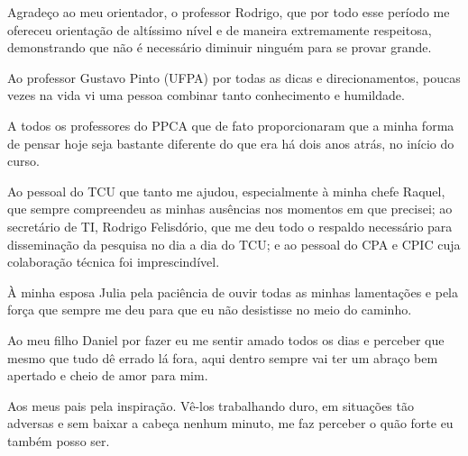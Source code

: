Agradeço ao meu orientador, o professor Rodrigo, que por todo esse período
me ofereceu orientação de altíssimo nível e de maneira extremamente respeitosa,
demonstrando que não é necessário diminuir ninguém para se provar grande.

Ao professor Gustavo Pinto (UFPA) por todas as dicas e direcionamentos, poucas
vezes na vida vi uma pessoa combinar tanto conhecimento e humildade.

A todos os professores do PPCA que de fato proporcionaram que a minha forma de
pensar hoje seja bastante diferente do que era há dois anos atrás, no início do
curso.

Ao pessoal do TCU que tanto me ajudou, especialmente à minha chefe Raquel, que
sempre compreendeu as minhas ausências nos momentos em que precisei; ao
secretário de TI, Rodrigo Felisdório, que me deu todo o respaldo necessário para
disseminação da pesquisa no dia a dia do TCU; e ao pessoal do CPA e CPIC cuja
colaboração técnica foi imprescindível.

À minha esposa Julia pela paciência de ouvir todas as minhas lamentações e pela
força que sempre me deu para que eu não desistisse no meio do caminho.

Ao meu filho Daniel por fazer eu me sentir amado todos os dias e perceber que
mesmo que tudo dê errado lá fora, aqui dentro sempre vai ter um abraço bem
apertado e cheio de amor para mim.

Aos meus pais pela inspiração. Vê-los trabalhando duro, em situações tão
adversas e sem baixar a cabeça nenhum minuto, me faz perceber o quão forte eu
também posso ser.

